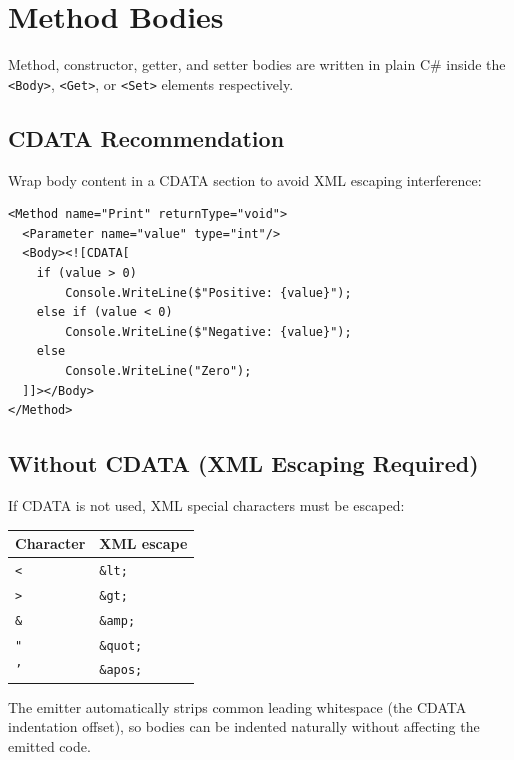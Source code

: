 \documentclass[11pt,a4paper]{article}
\newcommand{\el}[1]{\texttt{\textcolor{xoop-keyword}{<#1>}}}
\begin{document}
\section{Method Bodies}

Method, constructor, getter, and setter bodies are written in plain C\# inside
the \el{Body}, \el{Get}, or \el{Set} elements respectively.

\subsection{CDATA Recommendation}

Wrap body content in a CDATA section to avoid XML escaping interference:

\begin{lstlisting}[caption={Using CDATA for method bodies}]
<Method name="Print" returnType="void">
  <Parameter name="value" type="int"/>
  <Body><![CDATA[
    if (value > 0)
        Console.WriteLine($"Positive: {value}");
    else if (value < 0)
        Console.WriteLine($"Negative: {value}");
    else
        Console.WriteLine("Zero");
  ]]></Body>
</Method>
\end{lstlisting}

\subsection{Without CDATA (XML Escaping Required)}

If CDATA is not used, XML special characters must be escaped:

\begin{center}
\begin{tabular}{ll}
\toprule
Character & XML escape \\
\midrule
\texttt{<}  & \texttt{\&lt;} \\
\texttt{>}  & \texttt{\&gt;} \\
\texttt{\&} & \texttt{\&amp;} \\
\texttt{"}  & \texttt{\&quot;} \\
\texttt{'}  & \texttt{\&apos;} \\
\bottomrule
\end{tabular}
\end{center}

The emitter automatically strips common leading whitespace (the CDATA indentation
offset), so bodies can be indented naturally without affecting the emitted code.

\end{document}
